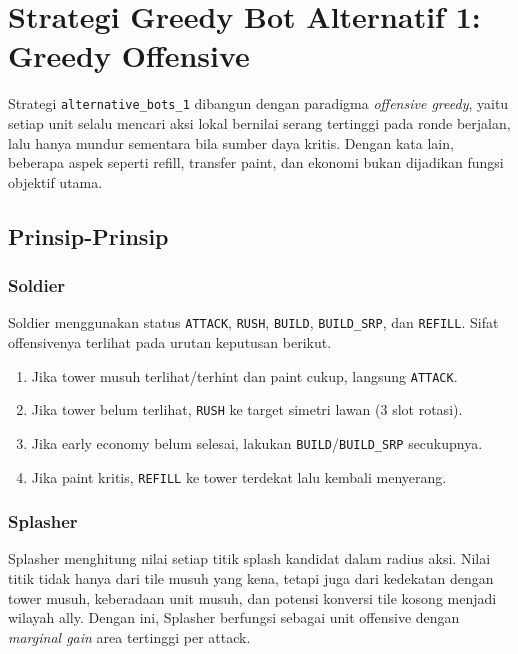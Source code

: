 \section{Strategi Greedy Bot Alternatif 1: Greedy Offensive}

Strategi \texttt{alternative\_bots\_1} dibangun dengan paradigma \textit{offensive greedy}, yaitu setiap unit selalu mencari aksi lokal bernilai serang tertinggi pada ronde berjalan, lalu hanya mundur sementara bila sumber daya kritis. Dengan kata lain, beberapa aspek seperti refill, transfer paint, dan ekonomi bukan dijadikan fungsi objektif utama.

\subsection{Prinsip-Prinsip}

\subsubsection{Soldier}

Soldier menggunakan status \texttt{ATTACK}, \texttt{RUSH}, \texttt{BUILD}, \texttt{BUILD\_SRP}, dan \texttt{REFILL}. Sifat offensivenya terlihat pada urutan keputusan berikut.

\begin{enumerate}
    \item Jika tower musuh terlihat/terhint dan paint cukup, langsung \texttt{ATTACK}.
    \item Jika tower belum terlihat, \texttt{RUSH} ke target simetri lawan (3 slot rotasi).
    \item Jika early economy belum selesai, lakukan \texttt{BUILD}/\texttt{BUILD\_SRP} secukupnya.
    \item Jika paint kritis, \texttt{REFILL} ke tower terdekat lalu kembali menyerang.
\end{enumerate}

\subsubsection{Splasher}

Splasher menghitung nilai setiap titik splash kandidat dalam radius aksi. Nilai titik tidak hanya dari tile musuh yang kena, tetapi juga dari kedekatan dengan tower musuh, keberadaan unit musuh, dan potensi konversi tile kosong menjadi wilayah ally. Dengan ini, Splasher berfungsi sebagai unit offensive dengan \textit{marginal gain} area tertinggi per attack.

